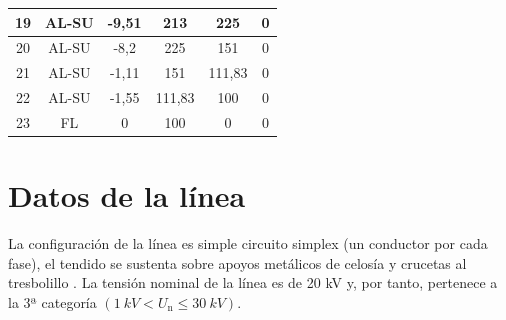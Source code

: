 \begin{table}[H]
\begin{tabular}{|c|c|c|c|c|c|}
19          & AL-SU            & -9,51                                                                    & 213                                                                      & 225                                                                       & 0                                                                              \\ \hline
20          & AL-SU            & -8,2                                                                     & 225                                                                      & 151                                                                       & 0                                                                              \\ \hline
21          & AL-SU            & -1,11                                                                    & 151                                                                      & 111,83                                                                    & 0                                                                              \\ \hline
22          & AL-SU            & -1,55                                                                    & 111,83                                                                   & 100                                                                       & 0                                                                              \\ \hline
23          & FL               & 0                                                                        & 100                                                                      & 0                                                                         & 0                                                                              \\ \hline
\end{tabular}
\end{table}

\section{Datos de la línea}
\label{sec:md-linea}
La configuración de la línea es simple circuito simplex (un conductor por cada fase), el tendido se sustenta sobre apoyos metálicos de celosía y crucetas al tresbolillo .
La tensión nominal de la línea es de 20 kV y, por tanto, pertenece a la 3ª categoría \(( \SI{1}{kV} < U_\text{n} \le \SI{30}{kV} ).\)

